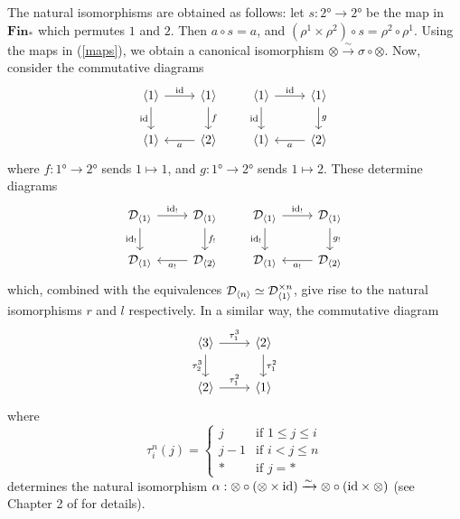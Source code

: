 \documentclass{MetricNotes2023}
\def\id{\ensuremath\text{id}}
\begin{document}
The natural isomorphisms are obtained as follows: let \(s : \ang{2}\to \ang{2}\) be the map in \(\textbf{Fin}_*\) which permutes \(1\) and \(2\). Then \(a \circ s =  a\), and \((\rho^1\times \rho^2) \circ s = \rho^2 \circ \rho^1\). Using the maps in (\ref{maps}), we obtain a canonical isomorphism \(\otimes \xrightarrow\sim \sigma \circ \otimes\). Now, consider the commutative diagrams
\[\begin{tikzcd}
\ang{1} \arrow[r, "\id"] \arrow[d, swap, "\id"]  & \ang{1} \arrow[d, "f"]  \\
\ang{1} & \ang{2} \arrow[l, "a"]
\end{tikzcd}\qquad \begin{tikzcd}
\ang{1} \arrow[r, "\id"] \arrow[d, swap, "\id"]  & \ang{1} \arrow[d, "g"]  \\
\ang{1} & \ang{2} \arrow[l, "a"]
\end{tikzcd}\]
where \(f : \ang{1}\to \ang{2}\) sends \(1\mapsto 1\), and \(g : \ang{1}\to \ang{2}\) sends \(1 \mapsto 2\). These determine diagrams 
\[\begin{tikzcd}
\mathcal{D}_{\ang{1}} \arrow[r, "\id_!"] \arrow[d, swap, "\id_!"]  & \mathcal{D}_{\ang{1}} \arrow[d, "f_!"]  \\
\mathcal{D}_{\ang{1}} & \mathcal{D}_{\ang{2}} \arrow[l, "a_!"]
\end{tikzcd}\qquad \begin{tikzcd}
\mathcal{D}_{\ang{1}} \arrow[r, "\id_!"] \arrow[d, swap, "\id_!"]  & \mathcal{D}_{\ang{1}} \arrow[d, "g_!"]  \\
\mathcal{D}_{\ang{1}} & \mathcal{D}_{\ang{2}} \arrow[l, "a_!"]
\end{tikzcd}\]
which, combined with the equivalences \(\mathcal{D}_{\langle n\rangle}\simeq \mathcal{D}_{\langle1\rangle}^{\times n}\), give rise to the natural isomorphisms \(r\) and \(l\) respectively. In a similar way, the commutative diagram
\[\begin{tikzcd}
\ang{3} \arrow[r, "\tau^3_1"] \arrow[d, swap, "\tau^3_2"]  & \ang{2} \arrow[d, "\tau^2_1"]  \\
\ang{2} \arrow[r, "\tau^2_1"] & \ang{1}
\end{tikzcd}\]
where 
\[\tau^n_i(j) =\begin{cases}
j &\text{if } 1 \leq j \leq i\\
j-1 &\text{if } i < j \leq n\\
* &\text{if } j = * 
\end{cases}\]
determines the natural isomorphism \(\alpha : \otimes \circ (\otimes \times \id) \xrightarrow{\sim}\otimes \circ (\id \times \otimes)\) (see Chapter 2 of \autocite{higheralgebra} for details). 
\end{document}
